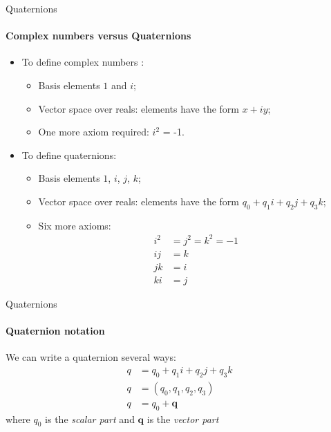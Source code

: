 \documentclass[aspectratio=169]{beamer}
\begin{document}
\begin{frame}{Quaternions}
    \framesubtitle{Complex numbers versus Quaternions}

    \begin{itemize}
        \item To define complex numbers  \cite{jeffcourse_2007}:
              \begin{itemize}
                  \item Basis elements $1$ and $i$;
                  \item Vector space over reals:  elements have the form $x+i y$;
                  \item One more axiom required:  $i^2$ = -1.
              \end{itemize}
        \item To define quaternions:
              \begin{itemize}
                  \item Basis elements $1$, $i$, $j$, $k$;
                  \item Vector space over reals:  elements have the form $q_0 + q_1 i + q_2 j + q_3 k$;
                  \item Six more axioms:
                        \begin{align*}
                            i^2 & = j^2 = k^2 = -1 \\
                            ij  & = k              \\
                            jk  & = i              \\
                            ki  & = j
                        \end{align*}
              \end{itemize}
    \end{itemize}
\end{frame}

\begin{frame}{Quaternions}
    \framesubtitle{Quaternion notation}

    We can write a quaternion several ways:
    \begin{align*}
        q & = q_0 + q_1 i + q_2 j + q_3 k \\
        q & = (q_0, q_1, q_2, q_3)        \\
        q & = q_0 + \mathbf{q}
    \end{align*}
    where $q_0$ is the \emph{scalar part} and $\mathbf{q}$ is the \emph{vector part}
\end{frame}
\end{document}
